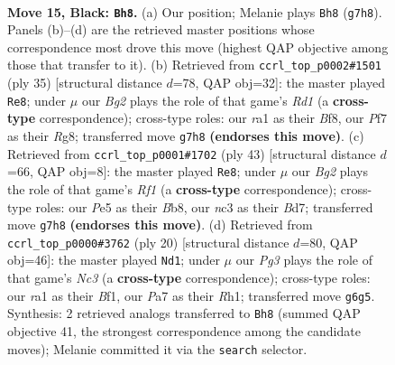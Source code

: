 \documentclass[11pt]{article}
\begin{document}
\begin{figure}[p]
\label{fig:thought-m27}
\end{figure}

\clearpage

\begin{figure}[p]\centering
\begin{subfigure}{0.46\textwidth}\centering
\resizebox{\linewidth}{!}{%
\newchessgame
\chessboard[
  setfen={rn1r1k2/p4pbp/2p2np1/P3p3/4P1bP/2N2N2/2P1BP2/R1B2RK1 b - - 0 15},
  showmover=false,
  pgfstyle=straightmove, color=movearrow, markmove={g7-h8}
]}
\caption{}
\end{subfigure}\hfill
\begin{subfigure}{0.46\textwidth}\centering
\resizebox{\linewidth}{!}{%
\newchessgame
\chessboard[
  setfen={2kr1br1/1pp3pp/p1p2n2/4p2b/P1N1P3/4BN1P/1PP2PP1/R3R1K1 b - - 0 18},
  showmover=false,
  pgfstyle=straightmove, color=movearrow, markmove={d8-e8}
]}
\caption{}
\end{subfigure}
\\[4pt]
\begin{subfigure}{0.46\textwidth}\centering
\resizebox{\linewidth}{!}{%
\newchessgame
\chessboard[
  setfen={rb3rk1/1p1b3p/4p1p1/3pn1B1/p2N4/P7/1PP1BPPP/3RR1K1 b - - 3 22},
  showmover=false,
  pgfstyle=straightmove, color=movearrow, markmove={f8-e8}
]}
\caption{}
\end{subfigure}\hfill
\begin{subfigure}{0.46\textwidth}\centering
\resizebox{\linewidth}{!}{%
\newchessgame
\chessboard[
  setfen={r1bbk2r/1p3ppp/2p2n2/p3p1B1/P3P3/2N2P2/1PP3PP/R3KB1R w KQkq - 0 11},
  showmover=false,
  pgfstyle=straightmove, color=movearrow, markmove={c3-d1}
]}
\caption{}
\end{subfigure}
\caption{\textbf{Move 15, Black: \texttt{Bh8}.} (a) Our position; Melanie plays \texttt{Bh8} (\texttt{g7h8}). Panels (b)--(d) are the retrieved master positions whose correspondence most drove this move (highest QAP objective among those that transfer to it). (b) Retrieved from \texttt{ccrl\_top\_p0002\#1501} (ply 35) [structural distance $d$=78, QAP obj=32]: the master played \texttt{Re8}; under $\mu$ our \emph{Bg2} plays the role of that game's \emph{Rd1} (a \textbf{cross-type} correspondence); cross-type roles: our \emph{r}a1 as their \emph{B}f8, our \emph{P}f7 as their \emph{R}g8; transferred move \texttt{g7h8} \textbf{(endorses this move)}. (c) Retrieved from \texttt{ccrl\_top\_p0001\#1702} (ply 43) [structural distance $d$=66, QAP obj=8]: the master played \texttt{Re8}; under $\mu$ our \emph{Bg2} plays the role of that game's \emph{Rf1} (a \textbf{cross-type} correspondence); cross-type roles: our \emph{P}e5 as their \emph{B}b8, our \emph{n}c3 as their \emph{B}d7; transferred move \texttt{g7h8} \textbf{(endorses this move)}. (d) Retrieved from \texttt{ccrl\_top\_p0000\#3762} (ply 20) [structural distance $d$=80, QAP obj=46]: the master played \texttt{Nd1}; under $\mu$ our \emph{Pg3} plays the role of that game's \emph{Nc3} (a \textbf{cross-type} correspondence); cross-type roles: our \emph{r}a1 as their \emph{B}f1, our \emph{P}a7 as their \emph{R}h1; transferred move \texttt{g6g5}. Synthesis: 2 retrieved analogs transferred to \texttt{Bh8} (summed QAP objective 41, the strongest correspondence among the candidate moves); Melanie committed it via the \texttt{search} selector.}

\end{figure}
\end{document}
